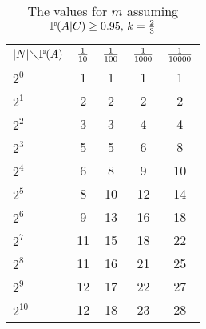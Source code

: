 \documentclass[11pt]{article}
\renewcommand{\P}{\mathbb{P}}
\begin{document}
    \begin{table}[H]
        \centering
        \caption{The values for $m$ assuming $\P(A|C) \ge 0.95,\, k = {2 \over 3}$}
        \label{tbl:k_2_3}
        \begin{tabular}{lcccc}
            \toprule
            $|N| \diagdown \P(A)$ & ${1 \over 10 }$ & ${1 \over 100 }$ & ${1 \over 1000 }$ & ${1 \over 10000 }$\\
            \midrule
            $2^0$               & 1               & 1                & 1                 & 1\\
            $2^1$               & 2               & 2                & 2                 & 2\\
            $2^2$               & 3               & 3                & 4                 & 4\\
            $2^3$               & 5               & 5                & 6                 & 8\\
            $2^4$               & 6               & 8                & 9                 & 10\\
            $2^5$               & 8               & 10               & 12                & 14\\
            $2^6$               & 9               & 13               & 16                & 18\\
            $2^7$               & 11              & 15               & 18                & 22\\
            $2^8$               & 11              & 16               & 21                & 25\\
            $2^9$               & 12              & 17               & 22                & 27\\
            $2^{10}$            & 12              & 18               & 23                & 28\\
            \bottomrule
        \end{tabular}
    \end{table}
\end{document}

